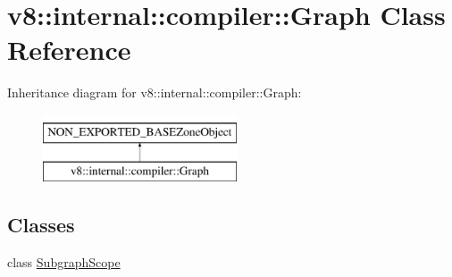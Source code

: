 \hypertarget{classv8_1_1internal_1_1compiler_1_1Graph}{}\section{v8\+:\+:internal\+:\+:compiler\+:\+:Graph Class Reference}
\label{classv8_1_1internal_1_1compiler_1_1Graph}
Inheritance diagram for v8\+:\+:internal\+:\+:compiler\+:\+:Graph\+:\begin{figure}[H]
\begin{center}
\leavevmode
\includegraphics[height=2.000000cm]{classv8_1_1internal_1_1compiler_1_1Graph}
\end{center}
\end{figure}
\subsection*{Classes}
\begin{DoxyCompactItemize}
\item 
class \mbox{\hyperlink{classv8_1_1internal_1_1compiler_1_1Graph_1_1SubgraphScope}{Subgraph\+Scope}}
\end{DoxyCompactItemize}
